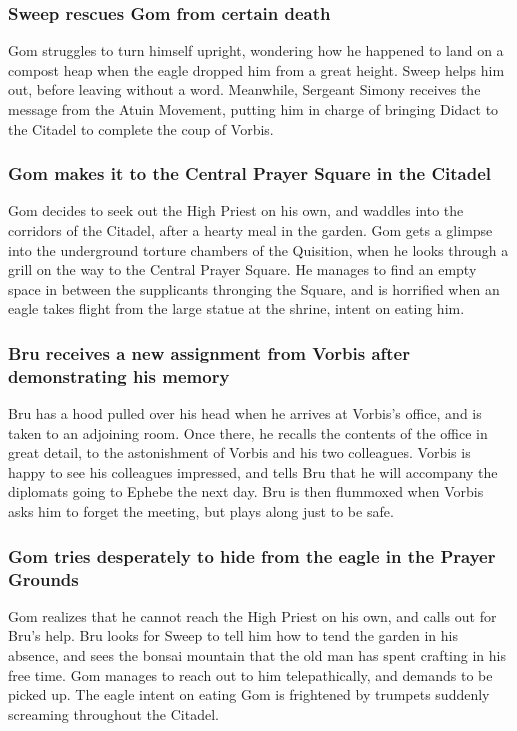 \subsubsection{\Gls{Sweep} rescues \Gls{Gom} from certain death}
\Gls{Gom} struggles to turn himself upright, wondering how he happened to land on a compost heap
when the eagle dropped him from a great height. \Gls{Sweep} helps him out, before leaving without a
word. Meanwhile, Sergeant \Gls{Simony} receives the message from the \Gls{Atuin} Movement, putting
him in charge of bringing \Gls{Didact} to the Citadel to complete the coup of \Gls{Vorbis}.

\subsubsection{\Gls{Gom} makes it to the Central Prayer Square in the Citadel}
\Gls{Gom} decides to seek out the High Priest on his own, and waddles into the corridors of the
Citadel, after a hearty meal in the garden. \Gls{Gom} gets a glimpse into the underground torture
chambers of the Quisition, when he looks through a grill on the way to the Central Prayer Square.
He manages to find an empty space in between the supplicants thronging the Square, and is horrified
when an eagle takes flight from the large statue at the shrine, intent on eating him.

\subsubsection{\Gls{Bru} receives a new assignment from \Gls{Vorbis} after demonstrating his memory}
\Gls{Bru} has a hood pulled over his head when he arrives at \Gls{Vorbis}'s office, and is taken to
an adjoining room. Once there, he recalls the contents of the office in great detail, to the
astonishment of \Gls{Vorbis} and his two colleagues. \Gls{Vorbis} is happy to see his colleagues
impressed, and tells \Gls{Bru} that he will accompany the diplomats going to Ephebe the next day.
\Gls{Bru} is then flummoxed when \Gls{Vorbis} asks him to forget the meeting, but plays along just
to be safe.

\subsubsection{\Gls{Gom} tries desperately to hide from the eagle in the Prayer Grounds}
\Gls{Gom} realizes that he cannot reach the High Priest on his own, and calls out for \Gls{Bru}'s
help. \Gls{Bru} looks for \Gls{Sweep} to tell him how to tend the garden in his absence, and sees
the bonsai mountain that the old man has spent crafting in his free time. \Gls{Gom} manages to
reach out to him telepathically, and demands to be picked up. The eagle intent on eating \Gls{Gom}
is frightened by trumpets suddenly screaming throughout the Citadel.

